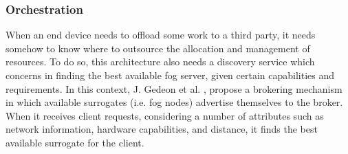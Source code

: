 \subsubsection{Orchestration}\label{sec:fog_arch_orchestration}
When an end device needs to offload some work to a third party, it needs somehow to know where to outsource the allocation and management of resources. To do so, this architecture also needs a discovery service which concerns in finding the best available fog server, given certain capabilities and requirements. In this context, J. Gedeon et al. \cite{gedeon2017router}, propose a brokering mechanism in which available surrogates (i.e. fog nodes) advertise themselves to the broker. When it receives client requests, considering a number of attributes such as network information, hardware capabilities, and distance, it finds the best available surrogate for the client.\\[6pt]
